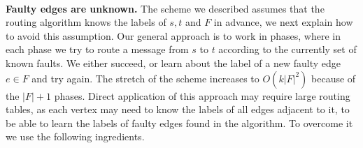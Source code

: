 %
%
\\
\noindent\textbf{Faulty edges are unknown.} The scheme we described assumes that the routing algorithm knows the labels of $s,t$ and $F$ in advance, we next explain how to avoid this assumption. Our general approach is to work in phases, where in each phase we try to route a message from $s$ to $t$ according to the currently set of known faults. We either succeed, or learn about the label of a new faulty edge $e \in F$ and try again. The stretch of the scheme increases to $O(k|F|^2)$ because of the $|F|+1$ phases. Direct application of this approach may require large routing tables, as each vertex may need to know the labels of all edges adjacent to it, to be able to learn the labels of faulty edges found in the algorithm. To overcome it we use the following ingredients. 

